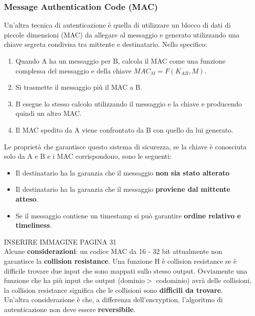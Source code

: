 \documentclass[12pt]{article}
\begin{document}
		\subsubsection{Message Authentication Code (MAC)}
			Un'altra tecnica di autenticazione è quella di utilizzare un blocco di dati di piccole dimensioni (MAC) da allegare al messaggio e generato utilizzando una chiave segreta condivisa tra mittente e destinatario. Nello specifico:
			\begin{enumerate}
				\item Quando A ha un messaggio per B, calcola il MAC come una funzione complessa del messaggio e della chiave $MAC_{M} = F(K_{AB},M)$.
				\item Si trasmette il messaggio più il MAC a B.
				\item B esegue lo stesso calcolo utilizzando il messaggio e la chiave e producendo quindi un altro MAC.
				\item Il MAC spedito da A viene confrontato da B con quello da lui generato. 
			\end{enumerate}
			Le proprietà che garantisce questo sistema di sicurezza, se la chiave è conosciuta solo da A e B e i MAC corrispondono, sono le seguenti:
			\begin{itemize}
				\item Il destinatario ha la garanzia che il messaggio \textbf{non sia stato alterato}
				\item Il destinatario ha la garanzia che il messaggio \textbf{proviene dal mittente atteso}.
				\item Se il messaggio contiene un timestamp si può garantire \textbf{ordine relativo e timeliness}.
			\end{itemize}
		
			INSERIRE IMMAGINE PAGINA 31\\
			Alcune \textbf{considerazioni}: un codice MAC da 16 - 32 bit attualmente non garantisce la \textbf{collision resistance}. Una funzione H è collision resistance se è difficile trovare due input che sono mappati sullo stesso output. Ovviamente una funzione che ha più input che output (dominio$>$ codominio) avrà delle collisioni, la collision resistance significa che le collisioni sono \textbf{difficili da trovare}.\\
			Un'altra considerazione è che, a differenza dell'encryption, l'algoritmo di autenticazione non deve essere \textbf{reversibile}.
\end{document}
